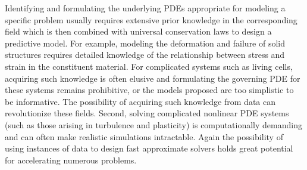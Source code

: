 Identifying and formulating the underlying PDEs appropriate for modeling a specific problem usually requires extensive prior knowledge in the corresponding field which is then combined with universal conservation laws to design a predictive model. For example, modeling the deformation and failure of solid structures requires detailed knowledge of the relationship between stress and strain in the constituent material. For complicated systems such as living cells, acquiring such knowledge is often elusive and formulating the governing PDE for these systems remains prohibitive, or the models
proposed are too simplistic to be informative. The possibility of acquiring such knowledge from data can revolutionize these fields. 
Second, solving complicated nonlinear PDE systems (such as those arising in turbulence and plasticity) is computationally demanding and can often make realistic simulations intractable. Again the possibility of using instances of data to design fast approximate solvers holds great potential for accelerating numerous problems.

